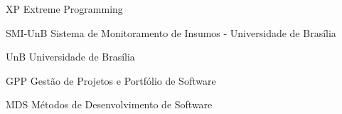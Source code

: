 \begin{siglas}
  \item[XP] Extreme Programming
  \item[SMI-UnB] Sistema de Monitoramento de Insumos - Universidade de Brasília
  \item[UnB] Universidade de Brasília
  \item[GPP] Gestão de Projetos e Portfólio de Software
  \item[MDS] Métodos de Desenvolvimento de Software
\end{siglas}
